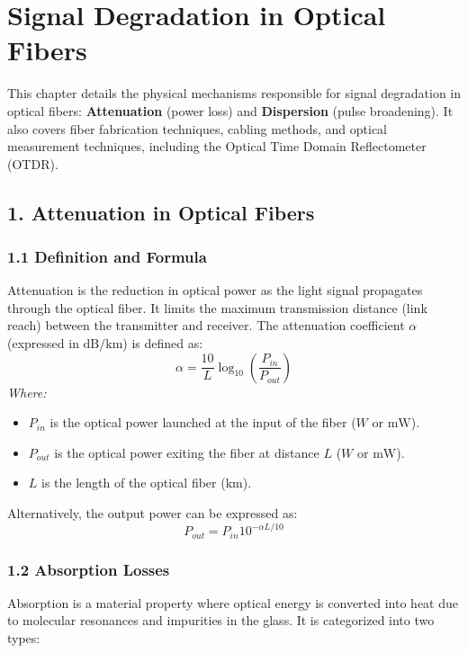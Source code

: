 \chapter{Signal Degradation in Optical Fibers}

This chapter details the physical mechanisms responsible for signal degradation in optical fibers: \textbf{Attenuation} (power loss) and \textbf{Dispersion} (pulse broadening). It also covers fiber fabrication techniques, cabling methods, and optical measurement techniques, including the Optical Time Domain Reflectometer (OTDR).


\section{1. Attenuation in Optical Fibers}

\subsection{1.1 Definition and Formula}
Attenuation is the reduction in optical power as the light signal propagates through the optical fiber. It limits the maximum transmission distance (link reach) between the transmitter and receiver.
The attenuation coefficient $\alpha$ (expressed in $\text{dB/km}$) is defined as:
\[ \alpha = \frac{10}{L} \log_{10}\left(\frac{P_{in}}{P_{out}}\right) \]
\textit{Where:}
\begin{itemize}
  \item   $P_{in}$ is the optical power launched at the input of the fiber ($W$ or $\text{mW}$).
  \item   $P_{out}$ is the optical power exiting the fiber at distance $L$ ($W$ or $\text{mW}$).
  \item   $L$ is the length of the optical fiber ($\text{km}$).
\end{itemize}

Alternatively, the output power can be expressed as:
\[ P_{out} = P_{in} 10^{-\alpha L / 10} \]

\subsection{1.2 Absorption Losses}
Absorption is a material property where optical energy is converted into heat due to molecular resonances and impurities in the glass. It is categorized into two types:

